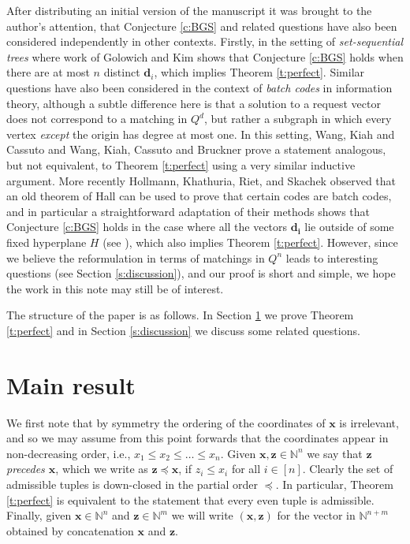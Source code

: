 \documentclass{article}
\begin{document}
After distributing an initial version of the manuscript it was brought to the author's attention, that Conjecture \ref{c:BGS} and related questions have also been considered independently in other contexts. Firstly, in the setting of \emph{set-sequential trees} where work of Golowich and Kim \cite{GK20} shows that Conjecture \ref{c:BGS} holds when there are at most $n$ distinct $\bm{d}_i$, which implies Theorem \ref{t:perfect}. Similar questions have also been considered in the context of \emph{batch codes} in information theory, although a subtle difference here is that a solution to a request vector does not correspond to a matching in $Q^d$, but rather a subgraph in which every vertex \emph{except} the origin has degree at most one. In this setting, Wang, Kiah and Cassuto \cite{WKC15} and Wang, Kiah, Cassuto and Bruckner \cite{WKCB17} prove a statement analogous, but not equivalent, to Theorem \ref{t:perfect} using a very similar inductive argument. More recently Hollmann, Khathuria, Riet, and Skachek \cite{HKAES23} observed that an old theorem of Hall \cite{HJR52} can be used to prove that certain codes are batch codes, and in particular a straightforward adaptation of their methods shows that 
Conjecture \ref{c:BGS} holds in the case where all the vectors $\bm{d_i}$ lie outside of some fixed hyperplane $H$ (see \cite[Remark 5.4]{HKAES23}), which also implies Theorem \ref{t:perfect}. However, since we believe the reformulation in terms of matchings in $Q^n$ leads to interesting questions (see Section \ref{s:discussion}), and our proof is short and simple, we hope the work in this note may still be of interest.

The structure of the paper is as follows. In Section \ref{s:main} we prove Theorem \ref{t:perfect} and in Section \ref{s:discussion} we discuss some related questions.

\section{Main result}\label{s:main}
We first note that by symmetry the ordering of the coordinates of $\bm{x}$ is irrelevant, and so we may assume from this point forwards that the coordinates appear in non-decreasing order, i.e., $x_1 \leq x_2 \leq \ldots \leq x_n$. Given $\bm{x},\bm{z} \in \mathbb{N}^{n}$ we say that \emph{$\bm{z}$ precedes $\bm{x}$}, which we write as $\bm{z} \preceq \bm{x}$, if $z_i \leq x_i$ for all $i \in [n]$. Clearly the set of admissible tuples is down-closed in the partial order $\preceq$. In particular, Theorem \ref{t:perfect} is equivalent to the statement that every even tuple is admissible. Finally, given $\bm{x} \in \mathbb{N}^{n}$ and $\bm{z} \in \mathbb{N}^{m}$ we will write $(\bm{x},\bm{z})$ for the vector in $\mathbb{N}^{n+m}$ obtained by concatenation $\bm{x}$ and $\bm{z}$.
\end{document}
